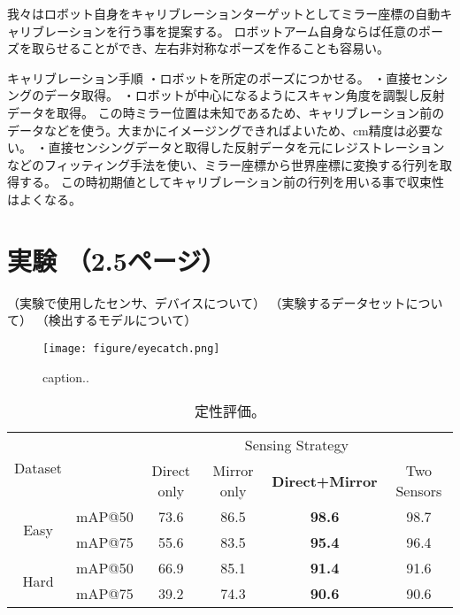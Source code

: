 \documentclass[xelatex,ja=standard]{bxjsarticle}
\begin{document}
我々はロボット自身をキャリブレーションターゲットとしてミラー座標の自動キャリブレーションを行う事を提案する。
ロボットアーム自身ならば任意のポーズを取らせることができ、左右非対称なポーズを作ることも容易い。

キャリブレーション手順
・ロボットを所定のポーズにつかせる。
・直接センシングのデータ取得。
・ロボットが中心になるようにスキャン角度を調製し反射データを取得。
この時ミラー位置は未知であるため、キャリブレーション前のデータなどを使う。大まかにイメージングできればよいため、cm精度は必要ない。
・直接センシングデータと取得した反射データを元にレジストレーションなどのフィッティング手法を使い、ミラー座標から世界座標に変換する行列を取得する。
この時初期値としてキャリブレーション前の行列を用いる事で収束性はよくなる。

\section{実験 （2.5ページ）}
（実験で使用したセンサ、デバイスについて）
（実験するデータセットについて）
（検出するモデルについて）

\begin{figure*}[ht!]
\centering
  \texttt{[image: figure/eyecatch.png]}
  \caption{caption..}
  \label{fig-concept}
\end{figure*}

\begin{table*}[th!]
\centering
\caption{定性評価。}
\label{ablation}
\begin{tabular}{|c|c|c|c|c|c|}
\hline
\multicolumn{1}{|l|}{\multirow{2}{*}{Dataset}} & \multicolumn{1}{l|}{\multirow{2}{*}{}} & \multicolumn{4}{c|}{Sensing Strategy}                            \\ \cline{3-6} 
\multicolumn{1}{|l|}{}                         & \multicolumn{1}{l|}{}                  & Direct only & Mirror only & \textbf{Direct+Mirror} & Two Sensors \\ \hline
\multirow{2}{*}{Easy}                          & mAP@50                                 & 73.6        & 86.5        & \textbf{98.6}          & 98.7        \\ \cline{2-6} 
                                               & mAP@75                                 & 55.6        & 83.5        & \textbf{95.4}          & 96.4        \\ \hline
\multirow{2}{*}{Hard}                          & mAP@50                                 & 66.9        & 85.1        & \textbf{91.4}          & 91.6        \\ \cline{2-6} 
                                               & mAP@75                                 & 39.2        & 74.3        & \textbf{90.6}          & 90.6        \\ \hline
\end{tabular}
\end{table*}
\end{document}
